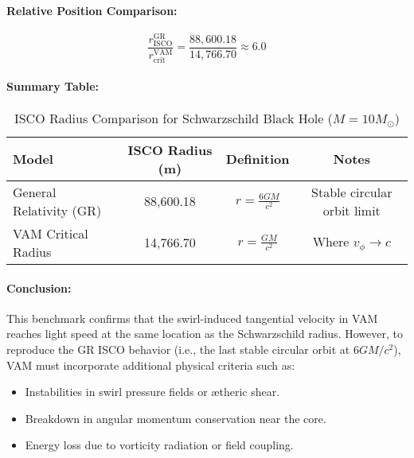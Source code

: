 \paragraph{Relative Position Comparison:}
\begin{equation}
    \frac{r_{\text{ISCO}}^{\text{GR}}}{r_{\text{crit}}^{\text{VAM}}} = \frac{88{,}600.18}{14{,}766.70} \approx 6.0
\end{equation}

\paragraph{Summary Table:}
\begin{table}[H]
\centering
\caption{ISCO Radius Comparison for Schwarzschild Black Hole (\( M = 10 M_\odot \))}
\begin{tabular}{lccc}
\toprule
Model & ISCO Radius (m) & Definition & Notes \\
\midrule
General Relativity (GR) & 88,600.18 & \( r = \frac{6GM}{c^2} \) & Stable circular orbit limit \\
VAM Critical Radius & 14,766.70 & \( r = \frac{GM}{c^2} \) & Where \( v_\phi \rightarrow c \) \\
\bottomrule
\end{tabular}
\end{table}

\paragraph{Conclusion:}
This benchmark confirms that the swirl-induced tangential velocity in VAM reaches light speed at the same location as the Schwarzschild radius. However, to reproduce the GR ISCO behavior (i.e., the last stable circular orbit at \( 6GM/c^2 \)), VAM must incorporate additional physical criteria such as:

\begin{itemize}
    \item Instabilities in swirl pressure fields or ætheric shear.
    \item Breakdown in angular momentum conservation near the core.
    \item Energy loss due to vorticity radiation or field coupling.
\end{itemize}

